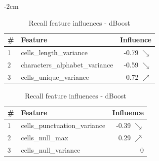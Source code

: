\begin{table}[H]
	\centering
	\addtolength{\leftskip} {-2cm}
	\addtolength{\rightskip}{-2cm}
	\captionsetup[subtable]{position = below}
	\captionsetup[table]{position=top}
	\caption{Top feature influences - dBoost}
	\label{tab:feature_influences_dBoost}
		\begin{subtable}{0.5\linewidth}
		\centering
		\begin{tabular}{llr}
\toprule
 \# &                         Feature &         Influence \\
\midrule
 1 &         cells\_length\_variance &  -0.79 $\searrow$ \\
 2 &  characters\_alphabet\_variance &  -0.59 $\searrow$ \\
 3 &         cells\_unique\_variance &   0.72 $\nearrow$ \\
\bottomrule
\end{tabular}
		\caption{Precision feature influences - dBoost}
		\label{tab:prec_feature_influences_dBoost}
	\end{subtable}
	\hspace*{4em}
	\begin{subtable}{0.5\linewidth}
		\centering
		\begin{tabular}{llr}
\toprule
 \# &                       Feature &         Influence \\
\midrule
 1 &  cells\_punctuation\_variance &  -0.39 $\searrow$ \\
 2 &              cells\_null\_max &   0.29 $\nearrow$ \\
 3 &         cells\_null\_variance &                 0 \\
\bottomrule
\end{tabular}
		\caption{Recall feature influences - dBoost}
		\label{tab:rec_feature_influences_dBoost}
	\end{subtable}%
\end{table}


